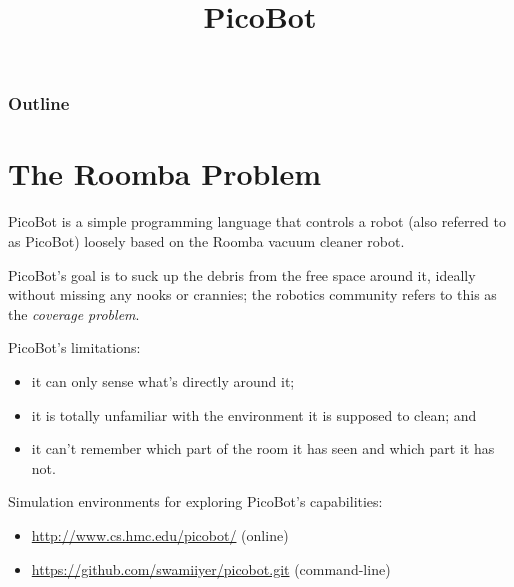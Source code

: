 \documentclass[8pt,a4paper,compress,handout]{beamer}
\title{PicoBot}
\date{}
\begin{document}
\begin{frame}
\vfill
\titlepage
\end{frame}

\begin{frame}
\frametitle{Outline}
\tableofcontents
\end{frame}

\section{The Roomba Problem}
\begin{frame}[fragile]
PicoBot is a simple programming language that controls a robot (also referred to as PicoBot) loosely based on the Roomba vacuum cleaner robot.

\bigskip

PicoBot's goal is to suck up the debris from the free space around it, ideally without missing any nooks or crannies; the robotics community refers to this as the \emph{coverage problem}.

\bigskip

PicoBot's limitations:
\begin{itemize}
\item it can only sense what's directly around it; 

\item it is totally unfamiliar with the environment it is supposed to clean; and 

\item it can't remember which part of the room it has seen and which part it has not.
\end{itemize}

\bigskip

Simulation environments for exploring PicoBot's capabilities:
\begin{itemize}
\item \href{http://www.cs.hmc.edu/picobot/}{http://www.cs.hmc.edu/picobot/} (online)

\item \href{https://github.com/swamiiyer/picobot.git}{https://github.com/swamiiyer/picobot.git} (command-line)
\end{itemize}
\end{frame}
\end{document}
